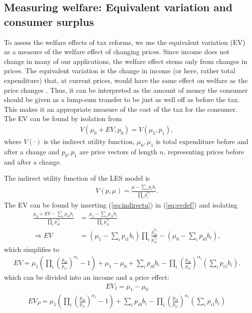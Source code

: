 \subsection{Measuring welfare: Equivalent variation and consumer surplus}\label{sec:measurewelfare}
To assess the welfare effects of tax reforms, we use the equivalent variation (EV) as a measure of the welfare effect of changing prices. Since income does not change in many of our applications, the welfare effect stems only from changes in prices. The equivalent variation is the change in income (or here, rather total expenditure) that, at current prices, would have the same effect on welfare as the price changes \citep{araar2019prices}. Thus, it can be interpreted as the amount of money the consumer should be given as a lump-sum transfer to be just as well off as before the tax. This makes it an appropriate measure of the cost of the tax for the consumer. The EV can be found by isolation from
\begin{align}\label{eq:evdef}
    V(\mu_0 + EV, p_0) = V(\mu_1, p_1),
\end{align}
where $V(\cdot)$ is the indirect utility function, $\mu_0,\mu_1$ is total expenditure before and after a change and $p_0,p_1$ are price vectors of length $n$, representing prices before and after a change.

The indirect utility function of the LES model is
\begin{align}\label{eq:indirectu}
    V(p,\mu) = \frac{\mu - \sum_i p_i b_i}{\prod_i p_i^{\alpha_i} }.
\end{align}
The EV can be found by inserting (\ref{eq:indirectu}) in (\ref{eq:evdef}) and isolating 
\begin{align}
    \frac{\mu_0 + EV - \sum_i p_{i0} b_i}{\prod_i p_{i0}^{\alpha_i} } &= \frac{\mu_1 - \sum_i p_{i1} b_i}{\prod_i p_{i1}^{\alpha_i} }  \\
    \Rightarrow EV &= (\mu_1 - \sum_i p_{i1} b_i) \prod_i \frac{p_{i0}^{\alpha_i}}{p_{i1}^{\alpha_i}} - (\mu_0  - \sum_i p_{i0}b_i),
\end{align}
which simplifies to 
\begin{align}
    EV = \mu_1 \left( \prod_i \left (\frac{p_{i0}}{p_{i1}}\right)^{\alpha_i}-1 \right) + \mu_1 - \mu_0 + \sum_i p_{i0}b_i - \prod_i \left(\frac{p_{i0}}{p_{i1}}\right)^{\alpha_i} \left( \sum_i p_{i1} b_i \right).
\end{align}
which can be divided into an income and a price effect:
\begin{align}
    EV_I = \mu_1 - \mu_0 
\end{align}
\begin{align}
    EV_P = \mu_1 \left( \prod_i \left (\frac{p_{i0}}{p_{i1}}\right)^{\alpha_i}-1 \right) + \sum_i p_{i0}b_i - \prod_i \left(\frac{p_{i0}}{p_{i1}}\right)^{\alpha_i} \left( \sum_i p_{i1} b_i \right)
\end{align}
